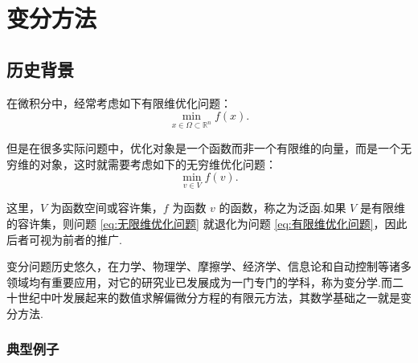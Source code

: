 \chapter{变分方法}

\section{历史背景}

在微积分中，经常考虑如下有限维优化问题：
    \begin{equation}\label{eq:有限维优化问题}
        \min_{x\in\Omega\subset\mathbb{R}^n} f(x).
    \end{equation}

但是在很多实际问题中，优化对象是一个函数而非一个有限维的向量，而是一个无穷维的对象，这时就需要考虑如下的无穷维优化问题：
    \begin{equation}\label{eq:无限维优化问题}
        \min_{v\in V} f(v).
    \end{equation}

这里，$V$ 为函数空间或容许集，$f$ 为函数 $v$ 的函数，称之为泛函.如果 $V$ 是有限维的容许集，则问题 \eqref{eq:无限维优化问题} 就退化为问题 \eqref{eq:有限维优化问题}，因此后者可视为前者的推广.

变分问题历史悠久，在力学、物理学、摩擦学、经济学、信息论和自动控制等诸多领域均有重要应用，对它的研究业已发展成为一门专门的学科，称为变分学.而二十世纪中叶发展起来的数值求解偏微分方程的有限元方法，其数学基础之一就是变分方法.

\subsection{典型例子}


